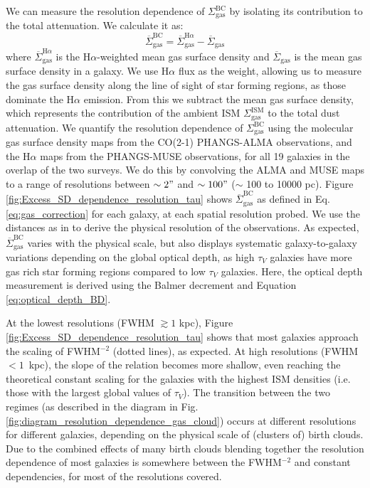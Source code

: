\documentclass[fleqn,usenatbib]{mnras}
\begin{document}
We can measure the resolution dependence of $\Sigma_{\textrm{gas}}^{\textrm{BC}}$ by isolating its contribution to the total attenuation. We calculate it as: 
\begin{equation}
    \overline{\Sigma}_{\textrm{gas}}^{\textrm{BC}} = \overline{\Sigma}_{\textrm{gas}}^{\textrm{H}\alpha} - \overline{\Sigma}_{\textrm{gas}} 
    \label{eq:gas_correction}
\end{equation}
where $\overline{\Sigma}_{\textrm{gas}}^{\textrm{H}\alpha}$ is the H$\alpha$-weighted mean gas surface density and $\overline{\Sigma}_{\textrm{gas}}$ is the mean gas surface density in a galaxy. We use H$\alpha$ flux as the weight, allowing us to measure the gas surface density along the line of sight of star forming regions, as those dominate the H$\alpha$ emission. From this we subtract the mean gas surface density, which represents the contribution of the ambient ISM $\Sigma_{\textrm{gas}}^{\textrm{ISM}}$ to the total dust attenuation. 
We quantify the resolution dependence of $\Sigma_{\textrm{gas}}^{\textrm{BC}}$ using the molecular gas surface density maps from the CO(2-1) PHANGS-ALMA observations,  and the H$\alpha$ maps from the PHANGS-MUSE observations, for all 19 galaxies in the overlap of the two surveys. We do this by convolving the ALMA and MUSE maps to a range of resolutions between $\sim2"$ and $\sim100"$ ($\sim$ 100 to 10000 pc). Figure \ref{fig:Excess_SD_dependence_resolution_tau} shows $\overline{\Sigma}_{\textrm{gas}}^{\textrm{BC}}$ as defined in Eq. \ref{eq:gas_correction} for each galaxy, at each spatial resolution probed. We use the distances as in \cite{leroy2021} to derive the physical resolution of the observations. As expected, $\overline{\Sigma}_{\textrm{gas}}^{\textrm{BC}}$ varies with the physical scale, but also displays systematic galaxy-to-galaxy variations depending on the global optical depth, as high $\tau_{V}$ galaxies have more gas rich star forming regions compared to low $\tau_{V}$ galaxies. Here, the optical depth measurement is derived using the Balmer decrement and Equation \ref{eq:optical_depth_BD}. 

At the lowest resolutions (FWHM $\gtrsim 1$ kpc), Figure  \ref{fig:Excess_SD_dependence_resolution_tau} shows that most galaxies approach the scaling of FWHM$^{-2}$ (dotted lines), as expected. At high resolutions (FWHM $< 1$~kpc), the slope of the relation becomes more shallow, even reaching the theoretical constant scaling for the galaxies with the highest ISM densities (i.e. those with the largest global values of $\tau_{V}$). The transition between the two regimes (as described in the diagram in Fig. \ref{fig:diagram_resolution_dependence_gas_cloud}) occurs at different resolutions for different galaxies, depending on the physical scale of (clusters of) birth clouds. Due to the combined effects of many birth clouds blending together the resolution dependence of most galaxies is somewhere between the FWHM$^{-2}$ and constant dependencies, for most of the resolutions covered. 
\end{document}
